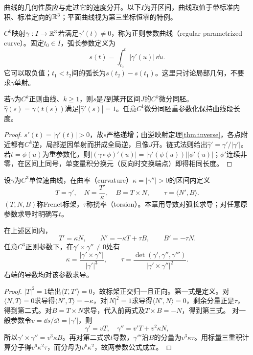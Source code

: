 曲线的几何性质应与走过它的速度分开。以下$I$为开区间，曲线取值于带标准内积、标准定向的$\mathbb{R}^3$；平面曲线视为第三坐标恒零的特例。
\begin{definition}[正则曲线与弧长]
$C^k$映射$\gamma:I\to\mathbb{R}^3$若满足$\gamma'(t)\ne0$，称为正则参数曲线（regular parametrized curve）。固定$t_0\in I$，弧长参数定义为
\[
 s(t)=\int_{t_0}^t|\gamma'(u)|\,\dd u.
\]
它可以取负值；$t_1<t_2$间的弧长为$s(t_2)-s(t_1)$。这里只讨论局部几何，不要求$\gamma$单射。
\end{definition}
\begin{theorem}[弧长参数与长度不变性]\label{thm:arc-length}
若$\gamma$为$C^k$正则曲线、$k\geq1$，则$s$是$I$到某开区间$J$的$C^k$微分同胚。$\widehat\gamma(s)=\gamma(t(s))$满足$|\widehat\gamma'(s)|=1$。任意$C^1$微分同胚重参数化保持曲线段长度。
\end{theorem}
\begin{proof}
$s'(t)=|\gamma'(t)|>0$，故$s$严格递增；由逆映射定理\ref{thm:inverse}，各点附近都有$C^k$逆，局部逆因单射而拼成全局逆，且像$J$开。链式法则给出$\widehat\gamma'=\gamma'/|\gamma'|$。若$t=\phi(u)$为重参数化，则$|(\gamma\circ\phi)'(u)|=|\gamma'(\phi(u))||\phi'(u)|$；$\phi'$连续非零，在区间上同号，单变量积分换元（反向时交换端点）即得相同长度。
\end{proof}
\begin{definition}
设$\gamma$为$C^3$单位速曲线，在曲率（curvature）$\kappa=|\gamma''|>0$的区间内定义
\[
 T=\gamma',\quad N=\frac{T'}{\kappa},\quad B=T\times N,
 \qquad \tau=\langle N',B\rangle.
\]
$(T,N,B)$称Frenet标架，$\tau$称挠率（torsion）。本章用导数对弧长求导；对任意原参数求导时明确写$t$。
\end{definition}
\begin{theorem}\label{thm:frenet}
在上述区间内，
\[
 T'=\kappa N,\qquad N'=-\kappa T+\tau B,\qquad B'=-\tau N.
\]
任意$C^3$正则参数下，在$\gamma'\times\gamma''\ne0$处有
\[
 \kappa=\frac{|\gamma'\times\gamma''|}{|\gamma'|^3},\qquad
 \tau=\frac{\det(\gamma',\gamma'',\gamma''')}{|\gamma'\times\gamma''|^2}.
\]
右端的导数均对该参数求导。
\end{theorem}
\begin{proof}
$|T|^2=1$给出$\langle T,T'\rangle=0$，故标架正交归一且正向。第一式是定义。对$\langle N,T\rangle=0$求导得$\langle N',T\rangle=-\kappa$，对$|N|^2=1$求导得$\langle N',N\rangle=0$，剩余分量正是$\tau$，得到第二式。对$B=T\times N$求导，代入前两式及$T\times B=-N$，得到第三式。
对一般参数令$v=\dd s/\dd t=|\gamma'|$，则
\[
 \gamma'=vT,\quad \gamma''=v'T+v^2\kappa N,
\]
所以$\gamma'\times\gamma''=v^3\kappa B$。再对第二式求$t$导数，$\gamma'''$沿$B$的分量为$v^3\kappa\tau$。用标量三重积计算分子得$v^6\kappa^2\tau$，而分母为$v^6\kappa^2$，故两参数公式成立。
\end{proof}
